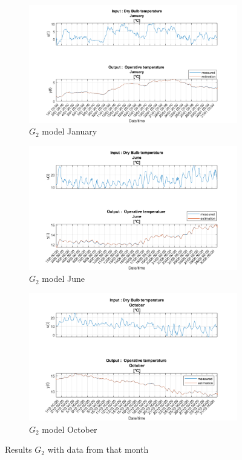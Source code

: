 \documentclass[a4paper,12pt]{article}
\numberwithin{equation}{section}
\begin{document}
\begin{figure}[H]
\centering
\begin{subfigure}{.5\textwidth}
  \centering
  \includegraphics[width=.7\linewidth]{G2_Jan.png}
  \caption{$G_{2}$ model January}
  \label{fig:G2 Jan}
\end{subfigure}%
\begin{subfigure}{.5\textwidth}
  \centering
  \includegraphics[width=.7\linewidth]{G2_June.png}
  \caption{$G_{2}$ model June}
  \label{fig:G2 June}
\end{subfigure}

\begin{subfigure}{\textwidth}
  \centering
  \includegraphics[scale=0.38]{G2_Oct.png}
  \caption{$G_{2}$ model October}
  \label{fig:G2 october}
\end{subfigure}
\caption{Results $G_{2}$ with data from that month}
\label{fig:G2othermonth}
\end{figure}
\end{document}
